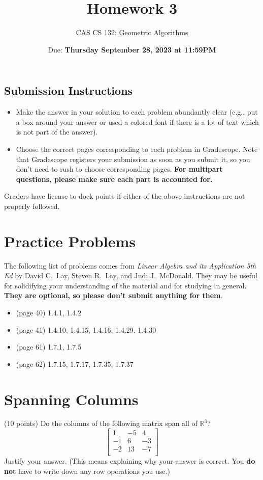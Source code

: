 \documentclass{article}
\title{
  Homework 3
}
\author{CAS CS 132: Geometric Algorithms}
\date{Due: \textbf{Thursday September 28, 2023 at 11:59PM}}
\theoremstyle{remark}
\begin{document}
\maketitle

\subsection*{Submission Instructions}
\begin{itemize}
\item Make the answer in your solution to each problem abundantly clear (e.g., put a box around your answer or used a colored font if there is a lot of text which is not part of the answer).
\item Choose the correct pages corresponding to each problem in Gradescope. Note that Gradescope registers your submission as soon as you submit it, so you don't need to rush to choose corresponding pages.
  \textbf{For multipart questions, please make sure each part is accounted for.}
\end{itemize}
Graders have license to dock points if either of the above instructions are not properly followed.


\section*{Practice Problems}

The following list of problems comes from \textit{Linear Algebra and its Application 5th Ed} by David C.\ Lay, Steven R.\ Lay, and Judi J.\ McDonald.
They may be useful for solidifying your understanding of the material and for studying in general.
\textbf{They are optional, so please don't submit anything for them}.

\begin{itemize}
\item (page 40) 1.4.1, 1.4.2
\item (page 41) 1.4.10, 1.4.15, 1.4.16, 1.4.29, 1.4.30
\item (page 61) 1.7.1, 1.7.5
\item (page 62) 1.7.15, 1.7.17, 1.7.35, 1.7.37
\end{itemize}

\pagebreak
\section{Spanning Columns}

(10 points) Do the columns of the following matrix span all of $\mathbb R^3$?
\begin{displaymath}
  \begin{bmatrix}
    1&-5&4\\
    -1&6&-3\\
    -2&13&-7\\
  \end{bmatrix}
\end{displaymath}
Justify your answer. (This means explaining why your answer is correct. You \textbf{do not} have to write down any row operations you use.)
\end{document}
